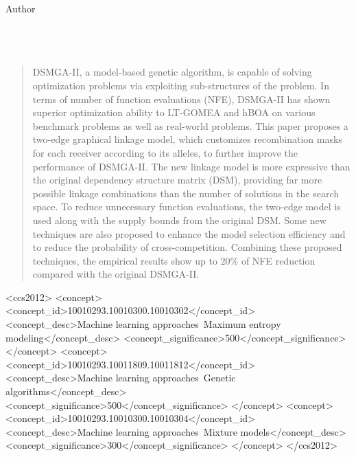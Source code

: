 \documentclass{sig-alternate-05-2015}
\begin{document}
{%
\alignauthor
Author\\
       \\
       \\
       \\
}


\maketitle
\begin{abstract}
DSMGA-II, a model-based genetic algorithm, is capable of solving optimization problems via exploiting sub-structures of the problem. In terms of number of function evaluations (NFE), DSMGA-II has shown superior optimization ability to LT-GOMEA and hBOA on various benchmark problems as well as real-world problems. This paper proposes a two-edge graphical linkage model, which customizes recombination masks for each receiver according to its alleles, to further improve the performance of DSMGA-II.  The new linkage model is more expressive than the original dependency structure matrix (DSM), providing far more possible linkage combinations than the number of solutions in the search space. To reduce unnecessary function evaluations, the two-edge model is used along with the supply bounds from the original DSM. Some new techniques are also proposed to enhance the model selection efficiency and to reduce the probability of cross-competition. Combining these proposed techniques, the empirical results show up to 20\% of NFE reduction compared with the original DSMGA-II.
\end{abstract}


%
%
\begin{CCSXML}
<ccs2012>
<concept>
<concept_id>10010293.10010300.10010302</concept_id>
<concept_desc>Machine learning approaches~Maximum entropy modeling</concept_desc>
<concept_significance>500</concept_significance>
</concept>
<concept>
<concept_id>10010293.10011809.10011812</concept_id>
<concept_desc>Machine learning approaches~Genetic algorithms</concept_desc>
<concept_significance>500</concept_significance>
</concept>
<concept>
<concept_id>10010293.10010300.10010304</concept_id>
<concept_desc>Machine learning approaches~Mixture models</concept_desc>
<concept_significance>300</concept_significance>
</concept>
</ccs2012>
\end{CCSXML}
\end{document}
